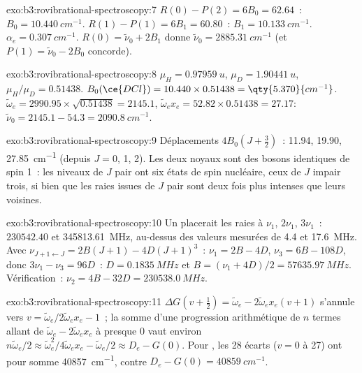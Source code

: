 \begin{solution}{exo:b3:rovibrational-spectroscopy:7}
$R(0) - P(2) = 6B_0 = 62.64$~: $B_0 = \qty{10.440}{cm^{-1}}$. $R(1) - P(1) = 6B_1 = 60.80$~:
$B_1 = \qty{10.133}{cm^{-1}}$. $\alpha_e = \qty{0.307}{cm^{-1}}$. $R(0) = \tilde\nu_0 + 2B_1$ donne
$\tilde\nu_0 = \qty{2885.31}{cm^{-1}}$ (et $P(1) = \tilde\nu_0 - 2B_0$
concorde).
\end{solution}

\begin{solution}{exo:b3:rovibrational-spectroscopy:8}
$\mu_H = \qty{0.97959}{u}$, $\mu_D = \qty{1.90441}{u}$, $\mu_H/\mu_D = 0.51438$. $B_0(\ce{DCl})
= 10.440 \times 0.51438 = \qty{5.370}{cm^{-1}}$. $\tilde\omega_e = 2990.95 \times \sqrt{0.51438}
= 2145.1$, $\tilde\omega_ex_e = 52.82 \times 0.51438 = 27.17$: $\tilde\nu_0 = 2145.1 - 54.3 =
\qty{2090.8}{cm^{-1}}$.
\end{solution}

\begin{solution}{exo:b3:rovibrational-spectroscopy:9}
Déplacements $4B_0(J + \frac32)$~: 11.94, 19.90, \qty{27.85}{cm^{-1}}
(depuis $J = 0$, 1, 2). Les
deux noyaux  sont des bosons identiques de spin 1~: les
niveaux de $J$ pair ont six états de spin nucléaire, ceux de $J$ impair
trois, si bien que les raies issues de $J$ pair sont deux fois plus
intenses que leurs voisines.
\end{solution}

\begin{solution}{exo:b3:rovibrational-spectroscopy:10}
Un  placerait les raies à $\nu_1$, $2\nu_1$, $3\nu_1$~: $230542.40$ et
\qty{345813.61}{MHz}, au-dessus des valeurs mesurées de 4.4 et
\qty{17.6}{MHz}. Avec
$\nu_{J+1\leftarrow J} = 2B(J+1) - 4D(J+1)^3$~: $\nu_1 = 2B - 4D$, $\nu_3 = 6B - 108D$, donc
$3\nu_1 - \nu_3 = 96D$~: $D = \qty{0.1835}{MHz}$ et $B = (\nu_1 + 4D)/2 =
\qty{57635.97}{MHz}$. Vérification~: $\nu_2 = 4B - 32D = \qty{230538.0}{MHz}$.
\end{solution}

\begin{solution}{exo:b3:rovibrational-spectroscopy:11}
$\Delta G(v + \frac12) = \tilde\omega_e - 2\tilde\omega_ex_e(v+1)$ s'annule vers $v =
\tilde\omega_e/2\tilde\omega_ex_e - 1$~; la somme d'une progression
arithmétique de $n$ termes
allant de $\tilde\omega_e - 2\tilde\omega_ex_e$ à presque 0 vaut environ $n\tilde\omega_e/2 \approx
\tilde\omega_e^2/4\tilde\omega_ex_e - \tilde\omega_e/2 \approx D_e - G(0)$. Pour , les 28 écarts
($v = 0$ à 27) ont pour somme \qty{40857}{cm^{-1}}, contre
$D_e - G(0) = \qty{40859}{cm^{-1}}$.
\end{solution}

